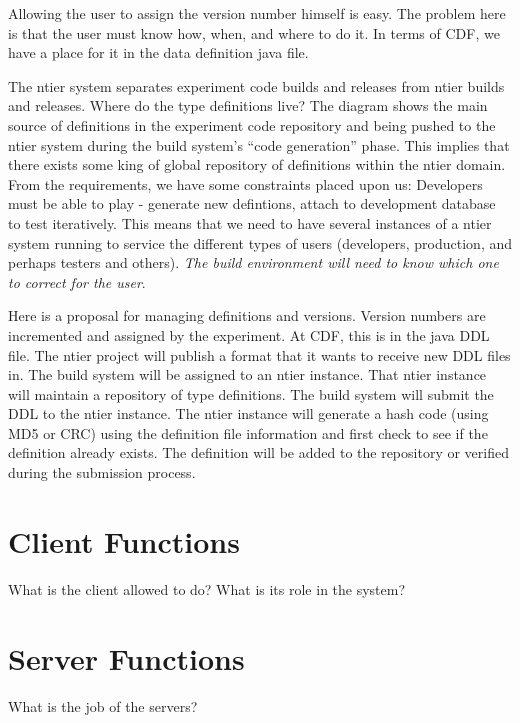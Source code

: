 Allowing the user to assign the version number himself is easy.
The problem here is that the user must know how, when, and where
to do it.  In terms of CDF, we have a place for it in the
data definition java file.

The ntier system separates experiment code builds and releases from 
ntier builds and releases.  Where do the type definitions live?
The diagram shows the main source of definitions in the experiment
code repository and being pushed to the ntier system during 
the build system's ``code generation'' phase.  This implies that
there exists some king of global repository of definitions within
the ntier domain.  From the requirements, we have some constraints
placed upon us: Developers must be able to play - generate new 
defintions, attach to development database to test iteratively.
This means that we need to have several instances of a ntier
system running to service the different types of users (developers,
production, and perhaps testers and others). 
\emph{The build environment will need to know which one to correct for the user}.

Here is a proposal for managing definitions and versions.  Version
numbers are incremented and assigned by the experiment.  At CDF,
this is in the java DDL file.  The ntier project will publish a 
format that it wants to receive new DDL files in.  The build system
will be assigned to an ntier instance.  That ntier instance will
maintain a repository of type definitions.  The build system will
submit the DDL to the ntier instance.  The ntier instance will 
generate a hash code (using MD5 or CRC) using the definition file
information and first check to see if the definition already exists.
The definition will be added to the repository or verified during the
submission process.

\section{Client Functions}

\begin{fixme}
What is the client allowed to do? What is its role in the system?
\end{fixme}

\section{Server Functions}

\begin{fixme}
What is the job of the servers?
\end{fixme}

